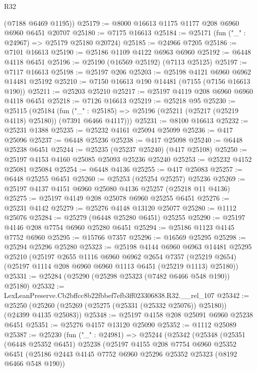 \begin{lexlean}{R32}
\begin{coremodule}
      (@7188 @6469 @1195))
@25179 := @8000 @16613 @1175 @1177 @208 @6960 @6960 @6451 @20707
@25180 := @7175 @16613
@25184 := @25171 (fun ("_" : @24967) => @25179 @25180 @20724)
@25185 := @24966 @7205
@25186 := @7101 @16613
@25190 := @25186 @1109 @4122 @6963 @6960
@25192 := @6448 @4118 @6451
@25196 := @25190 (@16569 @25192) (@7113 @25125)
@25197 := @7117 @16613
@25198 := @25197 @206
@25203 := @25198 @4121 @6960 @6962 @14481 @25192
@25210 := @7150 @16613 @190 @14481 (@7155 (@7156 @16613 @190))
@25211 := @25203 @25210
@25217 := @25197 @4119 @208 @6960 @6960 @4118 @6451
@25218 := @7126 @16613
@25219 := @25218 @95
@25230 := @25115
    (@25184
      (fun ("_" : @25185) => @25196 (@25211 (@25217 (@25219 @4118) @25180)) (@7391 @6466 @4117)))
@25231 := @8100 @16613
@25232 := @25231 @1388
@25235 := @25232 @4161 @25094 @25099
@25236 := @417 @25096
@25237 := @6448 @25236
@25238 := @417 @25098
@25240 := @6448 @25238 @6451
@25244 := @25235 (@25237 @25240) (@417 @25108)
@25250 := @25197 @4153 @4160 @25085 @25093 @25236 @25240
@25253 := @25232 @4152 @25081 @25084
@25254 := @6448 @4136
@25255 := @417 @25083
@25257 := @6448 @25255 @6451
@25260 := @25253 (@25254 @25257) @25236
@25269 := @25197 @4137 @4151 @6960 @25080 @4136 @25257 (@25218 @11 @4136)
@25275 := @25197 @4149 @208 @25078 @6960 @25255 @6451
@25276 := @25231 @4142
@25279 := @25276 @4148 @13120 @25077
@25280 := @1112 @25076
@25284 := @25279 (@6448 @25280 @6451) @25255
@25290 := @25197 @4146 @208 @7754 @6960 @25280 @6451
@25294 := @25186 @1123 @4145 @7752 @6960
@25295 := @15766 @7357
@25296 := @16569 @25295
@25298 := @25294 @25296 @25280
@25323 := @25198
    @4144
    @6960
    @6963
    @14481
    @25295
    @25210
    (@25197
      @2655
      @1116
      @6960
      @6962
      @2654
      @7357
      (@25219 @2654)
      (@25197 @1114 @208 @6960 @6960 @1113 @6451 (@25219 @1113) @25180))
@25331 := @25284 (@25290 (@25298 @25323 (@7482 @6466 @548 @190)) @25180)
@25332 := LexLeanPreserve.Cb2bffcc8b22fbbef7efb3ff023306838.R32.__rel_107
@25342 := @25250 (@25260 (@25269 (@25275 (@25331 (@25332 @25076)) @25180)) (@24399 @4135 @25083))
@25348 := @25197 @4158 @208 @25091 @6960 @25238 @6451
@25351 := @25276 @4157 @13120 @25090
@25352 := @1112 @25089
@25387 := @25230
    (fun ("_" : @24981) =>
    @25244
      (@25342
        (@25348
          (@25351
            (@6448 @25352 @6451)
            @25238
            (@25197
              @4155
              @208
              @7754
              @6960
              @25352
              @6451
              (@25186 @2443 @4145 @7752 @6960 @25296 @25352 @25323 (@8192 @6466 @548 @190))

\end{coremodule}
\end{lexlean}
